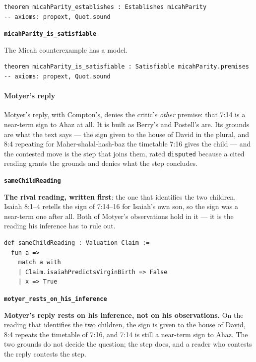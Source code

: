 \documentclass[11pt]{article}
\begin{document}
{\small\begin{verbatim}
theorem micahParity_establishes : Establishes micahParity
-- axioms: propext, Quot.sound
\end{verbatim}}
\par\medskip\noindent\textbf{\texttt{micah\allowbreak{}Parity\_\allowbreak{}is\_\allowbreak{}satisfiable}}\par\nobreak\noindent
The Micah counterexample has a model.

{\small\begin{verbatim}
theorem micahParity_is_satisfiable : Satisfiable micahParity.premises
-- axioms: propext, Quot.sound
\end{verbatim}}
\paragraph*{Motyer’s reply}
\leavevmode\par\nobreak
Motyer’s reply, with Compton’s, denies the critic’s \emph{other} premise: that 7:14 is a near-term sign to Ahaz at all. It is built as Berry’s and Postell’s are. Its grounds are what the text says — the sign given to the house of David in the plural, and 8:4 repeating for Maher-shalal-hash-baz the timetable 7:16 gives the child — and the contested move is the step that joins them, rated \texttt{disputed} because a cited reading grants the grounds and denies what the step concludes.

\par\medskip\noindent\textbf{\texttt{same\allowbreak{}Child\allowbreak{}Reading}}\par\nobreak\noindent
\textbf{The rival reading, written first}: the one that identifies the two children. Isaiah 8:1–4 retells the sign of 7:14–16 for Isaiah’s own son, so the sign was a near-term one after all. Both of Motyer’s observations hold in it — it is the reading his inference has to rule out.

{\small\begin{verbatim}
def sameChildReading : Valuation Claim :=
  fun a =>
    match a with
    | Claim.isaiahPredictsVirginBirth => False
    | x => True
\end{verbatim}}
\par\medskip\noindent\textbf{\texttt{motyer\_\allowbreak{}rests\_\allowbreak{}on\_\allowbreak{}his\_\allowbreak{}inference}}\par\nobreak\noindent
\textbf{Motyer’s reply rests on his inference, not on his observations.} On the reading that identifies the two children, the sign is given to the house of David, 8:4 repeats the timetable of 7:16, and 7:14 is still a near-term sign to Ahaz. The two grounds do not decide the question; the step does, and a reader who contests the reply contests the step.
\end{document}
